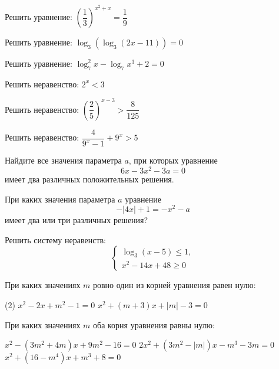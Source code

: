 \begin{exam}
	\begin{listofex}
		\item Решить уравнение: \( \left( \dfrac{1}{3} \right)^{x^2+x}=\dfrac{1}{9} \)
		\item Решить уравнение: \( \log_3(\log_3(2x-11))=0 \)
		\item Решить уравнение: \( \log^2_7x-\log_7x^3+2=0 \)
		\item Решить неравенство: \( 2^x<3 \)
		\item Решить неравенство: \( \left( \dfrac{2}{5} \right)^{x-3}>\dfrac{8}{125} \)
		\item Решить неравенство: \( \dfrac{4}{9^x-1}+9^x>5 \)
		\item Найдите все значения параметра \( a \), при которых уравнение
		\[ 6x-3x^2-3a=0 \]
		имеет два различных положительных решения.
		\item При каких значения параметра \( a \) уравнение
		\[ -|4x|+1=-x^2-a \]
		имеет два или три различных решения?
		\item Решить систему неравенств:
		\[ \left\{
		\begin{array}{l}
			\log_3(x-5)\le1,\\
			x^2-14x+48\ge0
		\end{array}
		\right. \]
	\end{listofex}
\end{exam}

\begin{consultation}
	\begin{listofex}
		\item При каких значениях \(m\) ровно один из корней уравнения равен нулю:
		\begin{tasks}(2)
			\task \( x^2-2x+m^2-1=0 \)
			\task \( x^2+(m+3)x+|m|-3=0 \)
		\end{tasks}
		\item При каких значениях \(m\) оба корня уравнения равны нулю:
		\begin{tasks}
			\task \( x^2-(3m^2+4m)x+9m^2-16=0 \)
			\task \( 2x^2+(3m^2-|m|)x-m^3-3m=0 \)
			\task \( x^2+(16-m^4)x+m^3+8=0 \)
		\end{tasks}
		
	\end{listofex}
\end{consultation}


